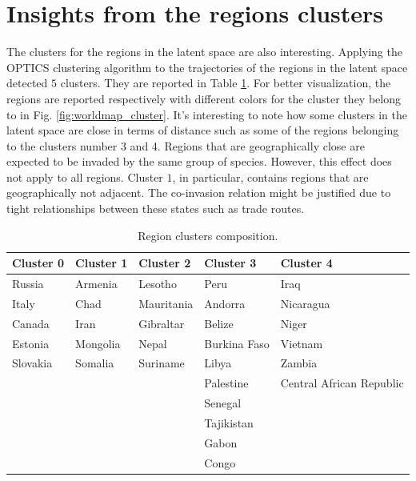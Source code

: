 \documentclass[mscthesis]{usiinfthesis}
\begin{document}
\section{Insights from the regions clusters}

The clusters for the regions in the latent space are also interesting. Applying the OPTICS clustering algorithm to the trajectories of the regions in the latent space detected $5$ clusters. They are reported in Table \ref{table:clusters_region}. For better visualization, the regions are reported respectively with different colors for the cluster they belong to in Fig. \ref{fig:worldmap_cluster}.  It's interesting to note how some clusters in the latent space are close in terms of distance such as some of the regions belonging to the clusters number 3 and 4. Regions that are geographically close are expected to be invaded by the same group of species. However, this effect does not apply to all regions. Cluster $1$, in particular, contains regions that are geographically not adjacent. The co-invasion relation might be justified due to tight relationships between these states such as trade routes.


\begin{table}[H]
\centering
\begin{tabular}{|l|l|l|l|l|}
\hline
Cluster 0 & Cluster 1                 & Cluster 2  & Cluster 3           & Cluster 4                \\ \hline
Russia    & Armenia                   & Lesotho    & Peru                & Iraq                     \\ \hline
Italy     & Chad                      & Mauritania & Andorra             & Nicaragua                \\ \hline
Canada    & Iran  & Gibraltar  & Belize              & Niger                    \\ \hline
Estonia   & Mongolia                  & Nepal      & Burkina Faso        & Vietnam                  \\ \hline
Slovakia  & Somalia                   & Suriname   & Libya               & Zambia                   \\ \hline
          &                           &            & Palestine & Central African Republic \\ \hline
          &                           &            & Senegal             &                          \\ \hline
          &                           &            & Tajikistan          &                          \\ \hline
          &                           &            & Gabon               &                          \\ \hline
          &                           &            & Congo               &                          \\ \hline
\end{tabular}
\caption{Region clusters composition.}
\label{table:clusters_region}
\end{table}
\end{document}
